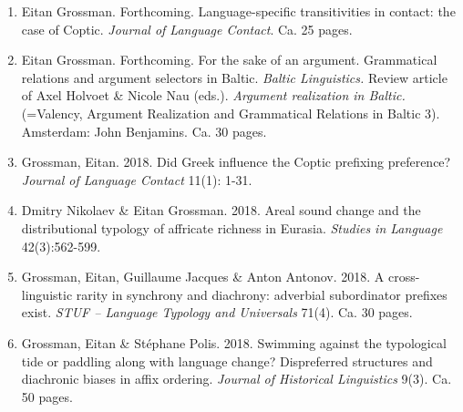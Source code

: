 \documentclass[letterpaper,11pt]{article}
\begin{document}
\begin{enumerate}[resume]




\item {Eitan Grossman.} {Forthcoming.} Language-specific transitivities in contact: the case of Coptic. \textit{Journal of Language Contact}. Ca. 25 pages.

\item {Eitan Grossman.} {Forthcoming.} For the sake of an argument. Grammatical relations and argument selectors in Baltic. \textit{Baltic Linguistics.} Review article of Axel Holvoet \& Nicole Nau (eds.). \textit{Argument realization in Baltic.} (=Valency, Argument Realization and Grammatical Relations in Baltic 3). Amsterdam: John Benjamins. Ca. 30 pages.

\item {Grossman, Eitan.} {2018.} Did Greek influence the Coptic prefixing preference? \textit{Journal of Language Contact} 11(1): 1-31.

\item {Dmitry Nikolaev \& Eitan Grossman.} {2018.} Areal sound change and the distributional typology of affricate richness in Eurasia. \textit{Studies in Language} 42(3):562-599.

\item {Grossman, Eitan, Guillaume Jacques \& Anton Antonov.} {2018.} A cross-linguistic rarity in synchrony and diachrony: adverbial subordinator prefixes exist. \textit{STUF -- Language Typology and Universals} 71(4). Ca. 30 pages.

\item {Grossman, Eitan \& St\'ephane Polis.} 2018. Swimming against the typological tide or paddling along with language change? Dispreferred structures and diachronic biases in affix ordering. \textit{Journal of Historical Linguistics} 9(3). Ca. 50 pages.


\end{enumerate}
\end{document}
